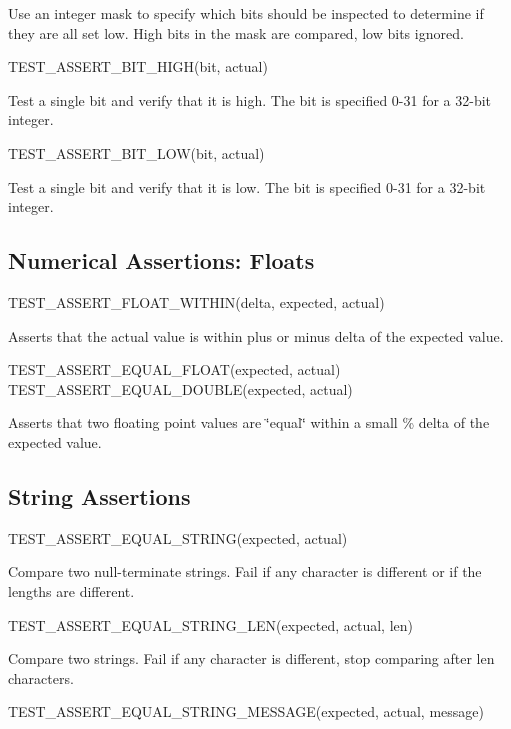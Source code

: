 Use an integer mask to specify which bits should be inspected to determine if they are all set low. High bits in the mask are compared, low bits ignored. \begin{DoxyVerb}TEST_ASSERT_BIT_HIGH(bit, actual)
\end{DoxyVerb}


Test a single bit and verify that it is high. The bit is specified 0-\/31 for a 32-\/bit integer. \begin{DoxyVerb}TEST_ASSERT_BIT_LOW(bit, actual)
\end{DoxyVerb}


Test a single bit and verify that it is low. The bit is specified 0-\/31 for a 32-\/bit integer.

\subsection*{Numerical Assertions\+: Floats }

\begin{DoxyVerb}TEST_ASSERT_FLOAT_WITHIN(delta, expected, actual)
\end{DoxyVerb}


Asserts that the actual value is within plus or minus delta of the expected value. \begin{DoxyVerb}TEST_ASSERT_EQUAL_FLOAT(expected, actual)
TEST_ASSERT_EQUAL_DOUBLE(expected, actual)
\end{DoxyVerb}


Asserts that two floating point values are \char`\"{}equal\char`\"{} within a small \% delta of the expected value.

\subsection*{String Assertions }

\begin{DoxyVerb}TEST_ASSERT_EQUAL_STRING(expected, actual)
\end{DoxyVerb}


Compare two null-\/terminate strings. Fail if any character is different or if the lengths are different. \begin{DoxyVerb}TEST_ASSERT_EQUAL_STRING_LEN(expected, actual, len)
\end{DoxyVerb}


Compare two strings. Fail if any character is different, stop comparing after len characters. \begin{DoxyVerb}TEST_ASSERT_EQUAL_STRING_MESSAGE(expected, actual, message)
\end{DoxyVerb}


